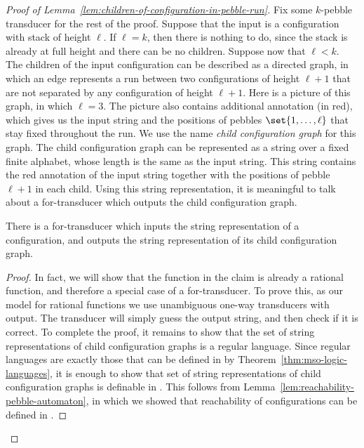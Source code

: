 \begin{proof}[Proof of Lemma~\ref{lem:children-of-configuration-in-pebble-run}] Fix some $k$-pebble transducer for the rest of the proof.   Suppose that the input is a configuration with stack of height $\ell$. If $\ell =k$, then there is nothing to do, since the stack is already at full height and there can be no children. Suppose now that $\ell < k$. The children of the input configuration can be  described as a directed graph, in which an edge represents a run between two configurations of height $\ell+1$ that are not separated by any configuration of height $\ell +1$. Here is a picture of this graph, in which $\ell=3$.
The picture also contains additional annotation (in red), which gives us the input string and the positions of pebbles $\set{1,\ldots,\ell}$ that stay fixed throughout the run. We use the name \emph{child configuration graph} for this graph. The child configuration graph can be represented as a string over a fixed finite alphabet, whose length is the same as the input string.  This string contains the red annotation of the input string together with the positions of pebble $\ell+1$ in each child. Using this string representation, it is meaningful to talk about a for-transducer which outputs the child configuration graph.

\begin{claim}\label{claim:from-configuration-to-child-configuration-graph}
    There is a for-transducer which inputs the string representation of a configuration, and outputs the  string representation of its child configuration graph. 
\end{claim}

\begin{proof}  In fact, we will show that the function in the claim is already a rational function, and therefore a special case of a for-transducer. To prove this, as our model for rational functions we use unambiguous one-way transducers with output. The transducer will simply guess the output string, and then check if it is correct. To complete the proof, it remains to show that the set of string representations of child configuration graphs is a regular language.
Since regular languages are exactly those that can be defined in \mso by Theorem~\ref{thm:mso-logic-languages}, it is enough to show that set of string representations of child configuration graphs is definable in \mso. This follows from  Lemma~\ref{lem:reachability-pebble-automaton}, in which we showed that  reachability of configurations can be defined in \mso. 
\end{proof}


\end{proof}

